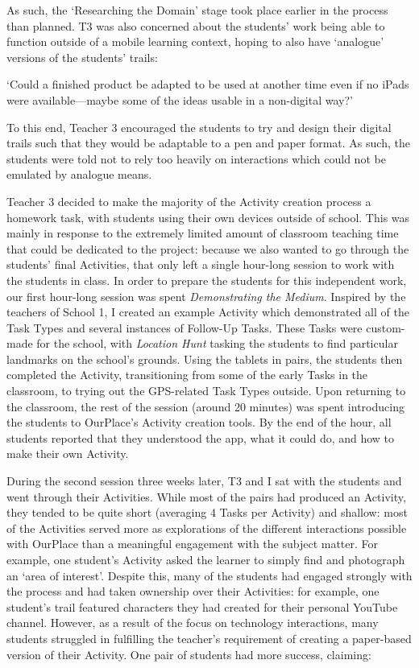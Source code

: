 As such, the `Researching the Domain' stage took place earlier in the process than planned. T3 was also concerned about the students' work being able to function outside of a mobile learning context, hoping to also have `analogue' versions of the students' trails: 

\begin{displayquote}
`Could a finished product be adapted to be used at another time even if no iPads were available---maybe some of the ideas usable in a non-digital way?'
\end{displayquote}

To this end, Teacher 3 encouraged the students to try and design their digital trails such that they would be adaptable to a pen and paper format. As such, the students were told not to rely too heavily on interactions which could not be emulated by analogue means.

Teacher 3 decided to make the majority of the Activity creation process a homework task, with students using their own devices outside of school. This was mainly in response to the extremely limited amount of classroom teaching time that could be dedicated to the project: because we also wanted to go through the students' final Activities, that only left a single hour-long session to work with the students in class. In order to prepare the students for this independent work, our first hour-long session was spent \textit{Demonstrating the Medium}. Inspired by the teachers of School 1, I created an example Activity which demonstrated all of the Task Types and several instances of Follow-Up Tasks. These Tasks were custom-made for the school, with \textit{Location Hunt} tasking the students to find particular landmarks on the school's grounds. Using the tablets in pairs, the students then completed the Activity, transitioning from some of the early Tasks in the classroom, to trying out the GPS-related Task Types outside. Upon returning to the classroom, the rest of the session (around 20 minutes) was spent introducing the students to OurPlace's Activity creation tools. By the end of the hour, all students reported that they understood the app, what it could do, and how to make their own Activity.

During the second session three weeks later, T3 and I sat with the students and went through their Activities. While most of the pairs had produced an Activity, they tended to be quite short (averaging 4 Tasks per Activity) and shallow: most of the Activities served more as explorations of the different interactions possible with OurPlace than a meaningful engagement with the subject matter. For example, one student's Activity asked the learner to simply find and photograph an `area of interest'. Despite this, many of the students had engaged strongly with the process and had taken ownership over their Activities: for example, one student's trail featured characters they had created for their personal YouTube channel. However, as a result of the focus on technology interactions, many students struggled in fulfilling the teacher's requirement of creating a paper-based version of their Activity. One pair of students had more success, claiming:

